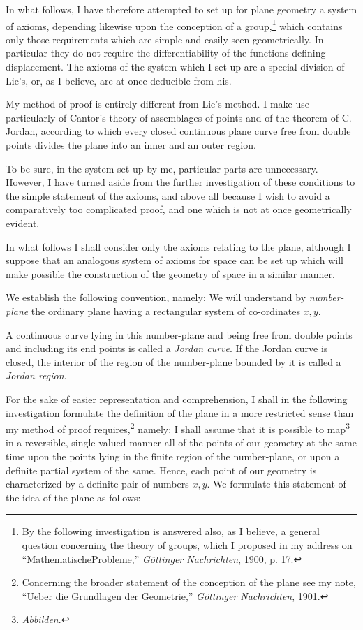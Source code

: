 \documentclass[11pt,oneside]{book}
\begin{document}
In what follows, I have therefore attempted to set
up for plane geometry a system of axioms, depending
likewise upon the conception of a group,\footnote{By
the following investigation is answered also, as I believe, a general
question concerning the theory of groups, which I proposed in my address
on ``MathematischeProbleme,'' \textit{G\"ottinger Nachrichten}, 1900, p. 17.}
which contains
only those requirements which are simple and
easily seen geometrically. In particular they do not
require the differentiability of the functions defining
displacement. The axioms of the system which I set
up are a special division of Lie's, or, as I believe, are
at once deducible from his.

My method of proof is entirely different from Lie's
method. I make use particularly of Cantor's theory
of assemblages of points and of the theorem of C. Jordan,
according to which every closed continuous plane
curve free from double points divides the plane into
an inner and an outer region.

To be sure, in the system set up by me, particular
parts are unnecessary. However, I have turned aside
from the further investigation of these conditions to
the simple statement of the axioms, and above all because
I wish to avoid a comparatively too complicated
proof, and one which is not at once geometrically evident.

In what follows I shall consider only the axioms
relating to the plane, although I suppose that an analogous
system of axioms for space can be set up which
will make possible the construction of the geometry
of space in a similar manner.

We establish the following convention, namely:
We will understand by \textit{number-plane} the ordinary plane
having a rectangular system of co-ordinates $x, y$.

A continuous curve lying in this number-plane and
being free from double points and including its end
points is called a \textit{Jordan curve}. If the Jordan curve
is closed, the interior of the region of the number-plane
bounded by it is called a \textit{Jordan region}.

For the sake of easier representation and comprehension,
I shall in the following investigation formulate
the definition of the plane in a more restricted
sense than my method of proof requires,\footnote{Concerning
the broader statement of the conception of the plane see my
note, ``Ueber die Grundlagen der Geometrie,'' \textit{G\"ottinger Nachrichten}, 1901.}
namely: I
shall assume that it is possible to map\footnote{\textit{Abbilden}.}
in a reversible, single-valued manner all of the points of our geometry
at the same time upon the points lying in the
finite region of the number-plane, or upon a definite
partial system of the same. Hence, each point of our
geometry is characterized by a definite pair of numbers
$x, y$. We formulate this statement of the idea
of the plane as follows:
\end{document}
